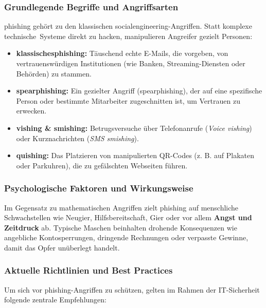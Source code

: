 \documentclass[12pt,a4paper]{article}
\begin{document}
\subsubsection{Grundlegende Begriffe und Angriffsarten}
\gls{phishing} gehört zu den klassischen \gls{socialengineering}-Angriffen. Statt komplexe \mbox{technische Systeme} direkt zu hacken, manipulieren Angreifer gezielt Personen:
\begin{itemize}
    \item \textbf{\gls{klassischesphishing}:} Täuschend echte E-Mails, die \mbox{vorgeben}, von \mbox{vertrauenswürdigen} \mbox{Institutionen} (wie Banken, Streaming-Diensten oder Behörden) zu \mbox{stammen}.
    \item \textbf{\gls{spearphishing}:} Ein gezielter Angriff (\gls{spearphishing}), der auf eine spezifische Person oder bestimmte Mitarbeiter zugeschnitten ist, um Vertrauen zu erwecken.
    \item \textbf{\gls{vishing} \& \gls{smishing}:} Betrugsversuche über Telefonanrufe (\textit{Voice \rightarrow \gls{vishing}}) oder \mbox{Kurznachrichten} (\textit{SMS \rightarrow \gls{smishing}}).
    \item \textbf{\gls{quishing}:} Das Platzieren von manipulierten QR-Codes (z. B. auf Plakaten oder Parkuhren), die zu gefälschten Webseiten führen.
\end{itemize}

\subsubsection{Psychologische Faktoren und Wirkungsweise}
Im Gegensatz zu mathematischen Angriffen zielt \gls{phishing} auf menschliche Schwachstellen wie Neugier, Hilfsbereitschaft, Gier oder vor allem \textbf{Angst und Zeitdruck} ab. Typische Maschen beinhalten drohende Konsequenzen wie angebliche Kontosperrungen, dringende Rechnungen oder verpasste Gewinne, damit das Opfer unüberlegt handelt.

\newpage
\subsubsection{Aktuelle Richtlinien und Best Practices}
Um sich vor \gls{phishing}-Angriffen zu schützen, gelten im Rahmen der IT-Sicherheit folgende zentrale Empfehlungen:
\end{document}
